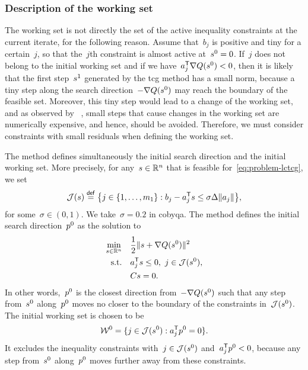 \subsubsection{Description of the working set}

The working set is not directly the set of the active inequality constraints at the current iterate, for the following reason.
Assume that~$b_j$ is positive and tiny for a certain~$j$, so that the~$j$th constraint is almost active at~$\sstep[0] = 0$.
If~$j$ does not belong to the initial working set and if we have~$a_j^{\T} \nabla Q(\sstep[0]) < 0$, then it is likely that the first step~$\sstep[1]$ generated by the \gls{tcg} method has a small norm, because a tiny step along the search direction~$-\nabla Q(\sstep[0])$ may reach the boundary of the feasible set.
Moreover, this tiny step would lead to a change of the working set, and as observed by \citeauthor{Powell_2015}~\cite[\S~3]{Powell_2015}, small steps that cause changes in the working set are numerically
expensive, and hence, should be avoided.
Therefore, we must consider constraints with small residuals when defining the working set.

The method defines simultaneously the initial search direction and the initial working set.
More precisely, for any~$\sstep \in \R^n$ that is feasible for~\cref{eq:problem-lctcg}, we set
\begin{equation*}
    \mathcal{J}(\sstep) \eqdef \set[\big]{j \in \set{1, \dots, m_1} : b_j - a_j^{\T} \sstep \le \sigma \rad \norm{a_j}},
\end{equation*}
for some~$\sigma \in (0, 1)$.
We take~$\sigma = 0.2$ in \gls{cobyqa}.
The method defines the initial search direction~$\pstep[0]$ as the solution to
\begin{subequations}
    \label{eq:tcg-linear-working-set}
    \begin{align}
        \min_{\sstep \in \R^n}  & \quad \frac{1}{2} \norm{\sstep + \nabla Q(\sstep[0])}^2\\
        \text{s.t.}             & \quad a_j^{\T} \sstep \le 0, ~ j \in \mathcal{J}(\sstep[0]),\\
                                & \quad C \sstep = 0.
    \end{align}
\end{subequations}
In other words,~$\pstep[0]$ is the closest direction from~$-\nabla Q(\sstep[0])$ such that any step from~$\sstep[0]$ along~$\pstep[0]$ moves no closer to the boundary of the constraints in~$\mathcal{J}(\sstep[0])$.
The initial working set is chosen to be
\begin{equation}
    \label{eq:tcg-linear-working-set-initial}
    \mathcal{W}^0 = \set{j \in \mathcal{J}(\sstep[0]) : a_j^{\T} \pstep[0] = 0}.
\end{equation}
It excludes the inequality constraints with~$j \in \mathcal{J}(\sstep[0])$ and~$a_j^{\T} \pstep[0] < 0$, because any step from~$\sstep[0]$ along~$\pstep[0]$ moves further away from these constraints.

